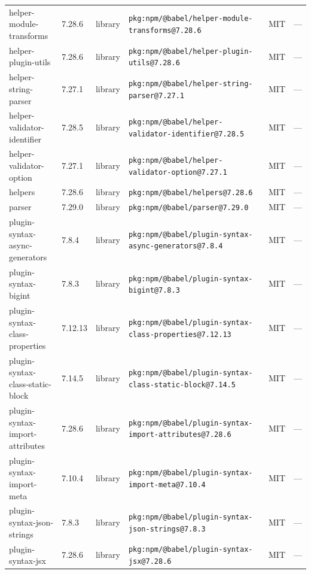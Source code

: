 \documentclass[11pt,a4paper]{article}
\begin{document}
\begin{longtable}{|p{4cm}|p{2cm}|p{1.6cm}|p{5cm}|p{1.5cm}|p{3.5cm}|}
\raggedright helper-module-transforms & 7.28.6 & library & \small\texttt{pkg:npm/@babel/helper-module-transforms@7.28.6} & MIT & \small — \\
\raggedright helper-plugin-utils & 7.28.6 & library & \small\texttt{pkg:npm/@babel/helper-plugin-utils@7.28.6} & MIT & \small — \\
\raggedright helper-string-parser & 7.27.1 & library & \small\texttt{pkg:npm/@babel/helper-string-parser@7.27.1} & MIT & \small — \\
\raggedright helper-validator-identifier & 7.28.5 & library & \small\texttt{pkg:npm/@babel/helper-validator-identifier@7.28.5} & MIT & \small — \\
\raggedright helper-validator-option & 7.27.1 & library & \small\texttt{pkg:npm/@babel/helper-validator-option@7.27.1} & MIT & \small — \\
\raggedright helpers & 7.28.6 & library & \small\texttt{pkg:npm/@babel/helpers@7.28.6} & MIT & \small — \\
\raggedright parser & 7.29.0 & library & \small\texttt{pkg:npm/@babel/parser@7.29.0} & MIT & \small — \\
\raggedright plugin-syntax-async-generators & 7.8.4 & library & \small\texttt{pkg:npm/@babel/plugin-syntax-async-generators@7.8.4} & MIT & \small — \\
\raggedright plugin-syntax-bigint & 7.8.3 & library & \small\texttt{pkg:npm/@babel/plugin-syntax-bigint@7.8.3} & MIT & \small — \\
\raggedright plugin-syntax-class-properties & 7.12.13 & library & \small\texttt{pkg:npm/@babel/plugin-syntax-class-properties@7.12.13} & MIT & \small — \\
\raggedright plugin-syntax-class-static-block & 7.14.5 & library & \small\texttt{pkg:npm/@babel/plugin-syntax-class-static-block@7.14.5} & MIT & \small — \\
\raggedright plugin-syntax-import-attributes & 7.28.6 & library & \small\texttt{pkg:npm/@babel/plugin-syntax-import-attributes@7.28.6} & MIT & \small — \\
\raggedright plugin-syntax-import-meta & 7.10.4 & library & \small\texttt{pkg:npm/@babel/plugin-syntax-import-meta@7.10.4} & MIT & \small — \\
\raggedright plugin-syntax-json-strings & 7.8.3 & library & \small\texttt{pkg:npm/@babel/plugin-syntax-json-strings@7.8.3} & MIT & \small — \\
\raggedright plugin-syntax-jsx & 7.28.6 & library & \small\texttt{pkg:npm/@babel/plugin-syntax-jsx@7.28.6} & MIT & \small — \\

\end{longtable}
\end{document}
